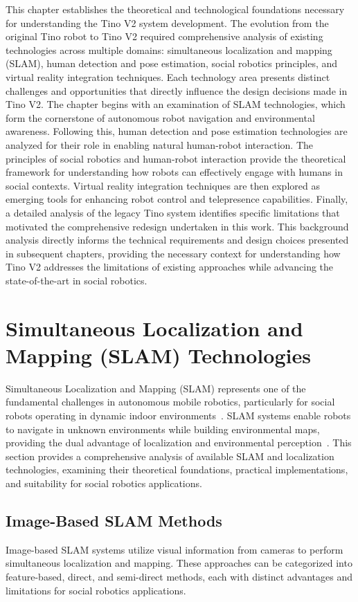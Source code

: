 This chapter establishes the theoretical and technological foundations necessary for understanding the Tino V2 system development. The evolution from the original Tino robot to Tino V2 required comprehensive analysis of existing technologies across multiple domains: simultaneous localization and mapping (SLAM), human detection and pose estimation, social robotics principles, and virtual reality integration techniques. Each technology area presents distinct challenges and opportunities that directly influence the design decisions made in Tino V2. The chapter begins with an examination of SLAM technologies, which form the cornerstone of autonomous robot navigation and environmental awareness. Following this, human detection and pose estimation technologies are analyzed for their role in enabling natural human-robot interaction. The principles of social robotics and human-robot interaction provide the theoretical framework for understanding how robots can effectively engage with humans in social contexts. Virtual reality integration techniques are then explored as emerging tools for enhancing robot control and telepresence capabilities. Finally, a detailed analysis of the legacy Tino system identifies specific limitations that motivated the comprehensive redesign undertaken in this work. This background analysis directly informs the technical requirements and design choices presented in subsequent chapters, providing the necessary context for understanding how Tino V2 addresses the limitations of existing approaches while advancing the state-of-the-art in social robotics.

\section{Simultaneous Localization and Mapping (SLAM) Technologies}
Simultaneous Localization and Mapping (SLAM) represents one of the fundamental challenges in autonomous mobile robotics, particularly for social robots operating in dynamic indoor environments~\cite{durrant2006simultaneous}. SLAM systems enable robots to navigate in unknown environments while building environmental maps, providing the dual advantage of localization and environmental perception~\cite{scaramuzza2011visual}. This section provides a comprehensive analysis of available SLAM and localization technologies, examining their theoretical foundations, practical implementations, and suitability for social robotics applications.

\subsection{Image-Based SLAM Methods}
Image-based SLAM systems utilize visual information from cameras to perform simultaneous localization and mapping. These approaches can be categorized into feature-based, direct, and semi-direct methods, each with distinct advantages and limitations for social robotics applications.

